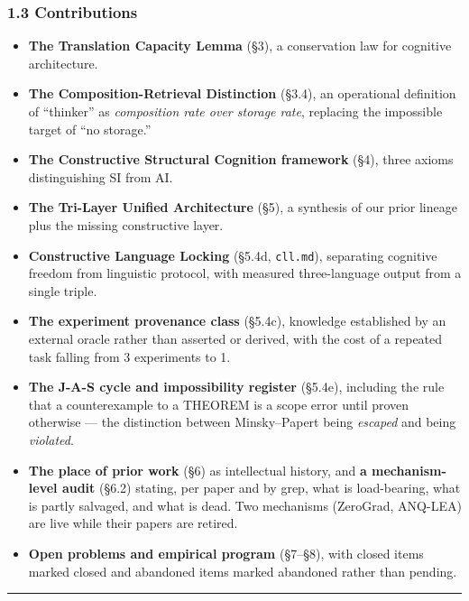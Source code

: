 \documentclass[
  11pt,
  a4paper,
]{article}
\providecommand{\tightlist}{%
  \setlength{\itemsep}{0pt}\setlength{\parskip}{0pt}}
\begin{document}
\subsubsection{1.3 Contributions}\label{contributions}

\begin{itemize}
\tightlist
\item
  \textbf{The Translation Capacity Lemma} (§3), a conservation law for
  cognitive architecture.
\item
  \textbf{The Composition-Retrieval Distinction} (§3.4), an operational
  definition of ``thinker'' as \emph{composition rate over storage
  rate}, replacing the impossible target of ``no storage.''
\item
  \textbf{The Constructive Structural Cognition framework} (§4), three
  axioms distinguishing SI from AI.
\item
  \textbf{The Tri-Layer Unified Architecture} (§5), a synthesis of our
  prior lineage plus the missing constructive layer.
\item
  \textbf{Constructive Language Locking} (§5.4d, \texttt{cll.md}),
  separating cognitive freedom from linguistic protocol, with measured
  three-language output from a single triple.
\item
  \textbf{The experiment provenance class} (§5.4c), knowledge
  established by an external oracle rather than asserted or derived,
  with the cost of a repeated task falling from 3 experiments to 1.
\item
  \textbf{The J-A-S cycle and impossibility register} (§5.4e), including
  the rule that a counterexample to a THEOREM is a scope error until
  proven otherwise --- the distinction between Minsky--Papert being
  \emph{escaped} and being \emph{violated}.
\item
  \textbf{The place of prior work} (§6) as intellectual history, and
  \textbf{a mechanism-level audit} (§6.2) stating, per paper and by
  grep, what is load-bearing, what is partly salvaged, and what is dead.
  Two mechanisms (ZeroGrad, ANQ-LEA) are live while their papers are
  retired.
\item
  \textbf{Open problems and empirical program} (§7--§8), with closed
  items marked closed and abandoned items marked abandoned rather than
  pending.
\end{itemize}

\begin{center}\rule{0.5\linewidth}{0.5pt}\end{center}
\end{document}
